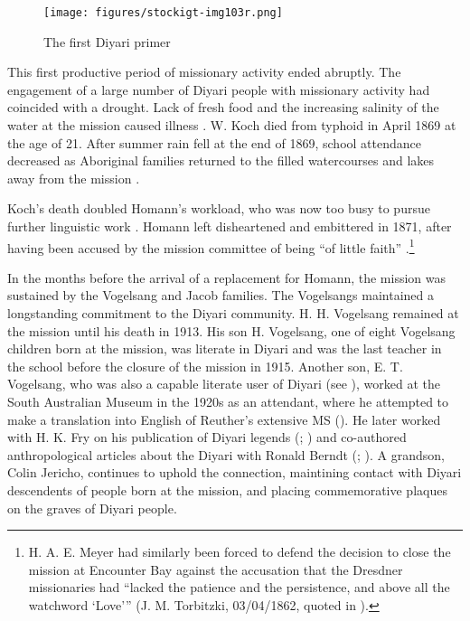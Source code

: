 \begin{figure}
\texttt{[image: figures/stockigt-img103r.png]}
\caption{The first Diyari primer \citep{koch_nujanujarajinkiniexa_1870}}
\label{bkm:Ref449374245}\label{fig:key:154}
\end{figure}

This first productive period of missionary activity ended abruptly. The engagement of a large number of Diyari people with missionary activity had coincided with a drought. Lack of fresh food and the increasing salinity of the water at the mission caused illness \citep[56]{harms_traume_2003}. W. Koch died from typhoid in April 1869 at the age of 21. After summer rain fell at the end of 1869, school attendance decreased as Aboriginal families returned to the filled watercourses and lakes away from the mission \citep[57]{harms_traume_2003}.

Koch’s death doubled Homann’s workload, who was now too busy to pursue further linguistic work \citep[56]{harms_traume_2003}. Homann left disheartened and embittered in 1871, after having been accused by the mission committee of being “of little faith'' \citep{ganter_neuendettelsau_2016}.\footnote{H. A. E. Meyer had similarly been forced to defend the decision to close the mission at Encounter Bay against the accusation that the Dresdner missionaries had “lacked the patience and the persistence, and above all the watchword `Love'\thinspace” (J. M. Torbitzki, 03/04/1862, quoted in \citealt[50]{zweck_for_2012}).}

In the months before the arrival of a replacement for Homann, the mission was sustained by the Vogelsang and Jacob families. The Vogelsangs maintained a longstanding commitment to the Diyari community. H. H. Vogelsang remained at the mission until his death in 1913. His son H. Vogelsang, one of eight Vogelsang children born at the mission, was literate in Diyari and was the last teacher in the school before the closure of the mission in 1915. Another son, E. T. Vogelsang, who was also a capable literate user of Diyari (see ), worked at the South Australian Museum in the 1920s as an attendant, where he attempted to make a translation into English of Reuther’s extensive MS (). He later worked with H. K. Fry on his publication of Diyari legends (\citeyear{fry_dieri_1937}; \citeyear{fry_dieri_1937-1}) and co-authored anthropological articles about the Diyari with Ronald Berndt (\citealt{Berndt1939}; \citealt{berndt_initiation_1941}). A grandson, Colin Jericho, continues to uphold the connection, maintining contact with Diyari descendents of people born at the mission, and placing commemorative plaques on the graves of Diyari people.


